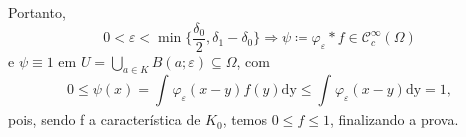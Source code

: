 \documentclass[../distribution_theory_notes.tex]{subfiles}
\begin{document}
\begin{proof*}
                                     Portanto, 
                                       \[
                                         0<\varepsilon <\min\limits_{}\biggl\{\frac{\delta_{0}}{2}, \delta_1-\delta_0\biggr\} \Rightarrow \psi \coloneqq \varphi_\varepsilon *f\in \mathcal{C}_{c}^{\infty}(\Omega )
                                       \]
                                       e \(\psi\equiv 1\) em \(U=\bigcup_{a\in K}^{}B(a; \varepsilon )\subseteq \Omega \), com 
                                         \[
                                           0\leq \psi (x)=\int_{}^{}\varphi_\varepsilon (x-y)f(y) \mathrm{dy}\leq \int_{}^{}\varphi_\varepsilon (x-y) \mathrm{dy}=1,
                                         \]
                                         pois, sendo f a característica de \(K_{0}\), temos \(0\leq f\leq 1\), finalizando a prova. \qedsymbol 

                             \end{proof*}
\end{document}
